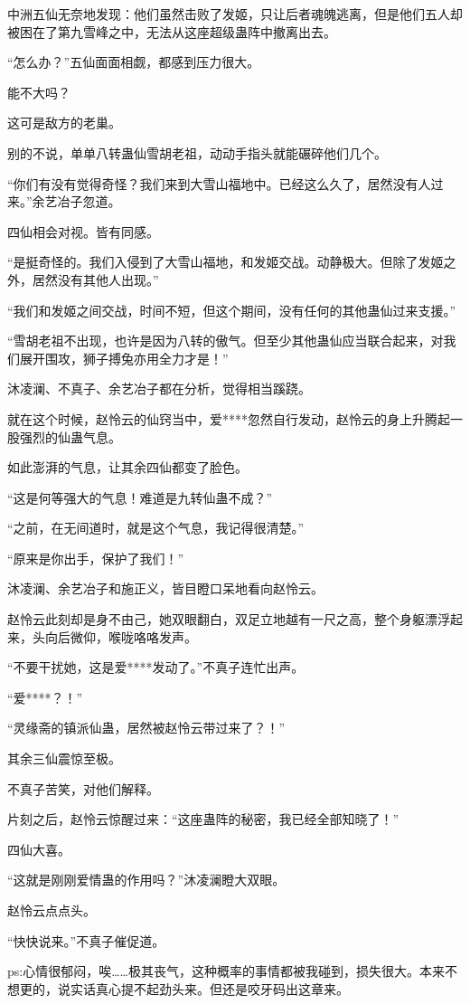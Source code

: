 \begin{this_body}
中洲五仙无奈地发现：他们虽然击败了发姬，只让后者魂魄逃离，但是他们五人却被困在了第九雪峰之中，无法从这座超级蛊阵中撤离出去。

“怎么办？”五仙面面相觑，都感到压力很大。

能不大吗？

这可是敌方的老巢。

别的不说，单单八转蛊仙雪胡老祖，动动手指头就能碾碎他们几个。

“你们有没有觉得奇怪？我们来到大雪山福地中。已经这么久了，居然没有人过来。”余艺冶子忽道。

四仙相会对视。皆有同感。

“是挺奇怪的。我们入侵到了大雪山福地，和发姬交战。动静极大。但除了发姬之外，居然没有其他人出现。”

“我们和发姬之间交战，时间不短，但这个期间，没有任何的其他蛊仙过来支援。”

“雪胡老祖不出现，也许是因为八转的傲气。但至少其他蛊仙应当联合起来，对我们展开围攻，狮子搏兔亦用全力才是！”

沐凌澜、不真子、余艺冶子都在分析，觉得相当蹊跷。

就在这个时候，赵怜云的仙窍当中，爱****忽然自行发动，赵怜云的身上升腾起一股强烈的仙蛊气息。

如此澎湃的气息，让其余四仙都变了脸色。

“这是何等强大的气息！难道是九转仙蛊不成？”

“之前，在无间道时，就是这个气息，我记得很清楚。”

“原来是你出手，保护了我们！”

沐凌澜、余艺冶子和施正义，皆目瞪口呆地看向赵怜云。

赵怜云此刻却是身不由己，她双眼翻白，双足立地越有一尺之高，整个身躯漂浮起来，头向后微仰，喉咙咯咯发声。

“不要干扰她，这是爱****发动了。”不真子连忙出声。

“爱****？！”

“灵缘斋的镇派仙蛊，居然被赵怜云带过来了？！”

其余三仙震惊至极。

不真子苦笑，对他们解释。

片刻之后，赵怜云惊醒过来：“这座蛊阵的秘密，我已经全部知晓了！”

四仙大喜。

“这就是刚刚爱情蛊的作用吗？”沐凌澜瞪大双眼。

赵怜云点点头。

“快快说来。”不真子催促道。

ps:心情很郁闷，唉……极其丧气，这种概率的事情都被我碰到，损失很大。本来不想更的，说实话真心提不起劲头来。但还是咬牙码出这章来。

\end{this_body}

